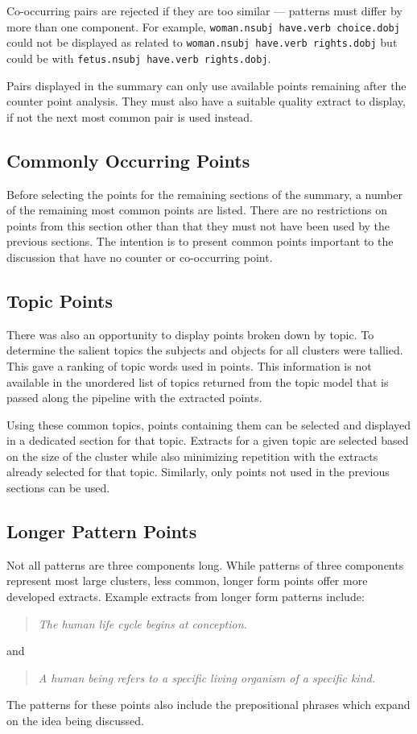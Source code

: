       Co-occurring pairs are rejected if they are too similar --- patterns must differ by more than one component. For example, \texttt{woman.nsubj have.verb choice.dobj} could not be displayed as related to \texttt{woman.nsubj have.verb rights.dobj} but could be with \texttt{fetus.nsubj have.verb rights.dobj}.

      Pairs displayed in the summary can only use available points remaining after the counter point analysis. They must also have a suitable quality extract to display, if not the next most common pair is used instead.
    \subsection{Commonly Occurring Points}
      Before selecting the points for the remaining sections of the summary, a number of the remaining most common points are listed. There are no restrictions on points from this section other than that they must not have been used by the previous sections. The intention is to present common points important to the discussion that have no counter or co-occurring point.

    \subsection{Topic Points}
      There was also an opportunity to display points broken down by topic. To determine the salient topics the subjects and objects for all clusters were tallied. This gave a ranking of topic words used in points. This information is not available in the unordered list of topics returned from the topic model that is passed along the pipeline with the extracted points.

      Using these common topics, points containing them can be selected and displayed in a dedicated section for that topic. Extracts for a given topic are selected based on the size of the cluster while also minimizing repetition with the extracts already selected for that topic. Similarly, only points not used in the previous sections can be used.

    \subsection{Longer Pattern Points}
    Not all patterns are three components long. While patterns of three components represent most large clusters, less common, longer form points offer more developed extracts. Example extracts from longer form patterns include: \blockquote{\textit{The human life cycle begins at conception.}} and \blockquote{\textit{A human being refers to a specific living organism of a specific kind.}}. The patterns for these points also include the prepositional phrases which expand on the idea being discussed.

